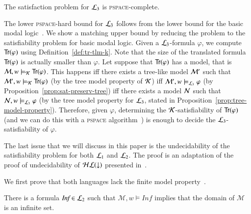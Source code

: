\begin{thm}
The satisfaction problem for $\mathcal{L}_3$ is \textsc{pspace}-complete.
\end{thm}
\begin{pf}
The lower \textsc{pspace}-hard bound for $\mathcal{L}_3$ follows from the
lower bound for the basic modal logic~\cite{BRV01}. We show a
matching upper bound by reducing the problem to the satisfiability
problem for basic modal logic. Given a $\mathcal{L}_3$-formula $\varphi$, we
compute ${\sf Tr}(\varphi)$ using Definition~\ref{def:tr-tlm-k}. Note
that the size of the translated formula ${\sf Tr}(\varphi)$ is actually
smaller than $\varphi$. Let suppose that ${\sf Tr}(\varphi)$ has a model,
that is $\mathcal{M}, w \models_{\mathcal{K}} {\sf Tr}(\varphi)$. This happens iff
there exists a tree-like model $\mathcal{M}'$ such that $\mathcal{M}', w
\models_{\mathcal{K}} {\sf Tr}(\varphi)$ (by the tree model property of $\mathcal{K}$)
iff $\mathcal{M}', w \models_{\mathcal{L}_3} \varphi$ (by
Proposition~\ref{prop:sat-preserv-tree}) iff there exists a model
$\mathcal{N}$ such that $\mathcal{N},w \models_{\mathcal{L}_3} \varphi$ (by the tree
model property for $\mathcal{L}_3$, stated in
Proposition~\ref{prop:tree-model-property}). Therefore, given
$\varphi$, determining the $\mathcal{K}$-satisfiability of ${\sf Tr}(\varphi)$
(and we can do this with a \textsc{pspace} algorithm~\cite{BRV01})
is enough to decide the $\mathcal{L}_3$-satisfiability of $\varphi$.
\end{pf}






The last issue that we will discuss in this paper
is the undecidability of the satisfiability problem
for both $\mathcal{L}_1$ and $\mathcal{L}_2$.  The proof is an adaptation
of the proof of undecidability of $\mathcal{HL}({\downarrow})$ presented in~\cite{BS95}.

We first prove that both languages lack the finite model property~\cite{BRV01}.

\begin{thm}\label{thm:infinite_model}
There is a formula {\em $\textit{Inf} \in \mathcal{L}_2$} such that $\mathcal{M},w \models \textit{Inf}$ implies that the domain of $\mathcal{M}$ is an infinite set.
\end{thm}

